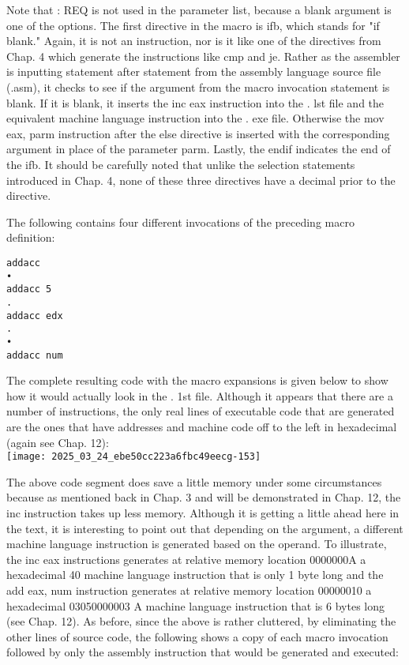 \documentclass[10pt]{article}
\begin{document}
Note that : REQ is not used in the parameter list, because a blank argument is one of the options. The first directive in the macro is ifb, which stands for "if blank." Again, it is not an instruction, nor is it like one of the directives from Chap. 4 which generate the instructions like cmp and je. Rather as the assembler is inputting statement after statement from the assembly language source file (.asm), it checks to see if the argument from the macro invocation statement is blank. If it is blank, it inserts the inc eax instruction into the . lst file and the equivalent machine language instruction into the . exe file. Otherwise the mov eax, parm instruction after the else directive is inserted with the corresponding argument in place of the parameter parm. Lastly, the endif indicates the end of the ifb. It should be carefully noted that unlike the selection statements introduced in Chap. 4, none of these three directives have a decimal prior to the directive.

The following contains four different invocations of the preceding macro definition:

\begin{verbatim}
addacc
•
addacc 5
.
addacc edx
.
•
addacc num
\end{verbatim}

The complete resulting code with the macro expansions is given below to show how it would actually look in the . 1st file. Although it appears that there are a number of instructions, the only real lines of executable code that are generated are the ones that have addresses and machine code off to the left in hexadecimal (again see Chap. 12):\\
\texttt{[image: 2025\_03\_24\_ebe50cc223a6fbc49eecg-153]}

The above code segment does save a little memory under some circumstances because as mentioned back in Chap. 3 and will be demonstrated in Chap. 12, the inc instruction takes up less memory. Although it is getting a little ahead here in the text, it is interesting to point out that depending on the argument, a different machine language instruction is generated based on the operand. To illustrate, the inc eax instructions generates at relative memory location 0000000A a hexadecimal 40 machine language instruction that is only 1 byte long and the add eax, num instruction generates at relative memory location 00000010 a hexadecimal 03050000003 A machine language instruction that is 6 bytes long (see Chap. 12). As before, since the above is rather cluttered, by eliminating the other lines of source code, the following shows a copy of each macro invocation followed by only the assembly instruction that would be generated and executed:
\end{document}
